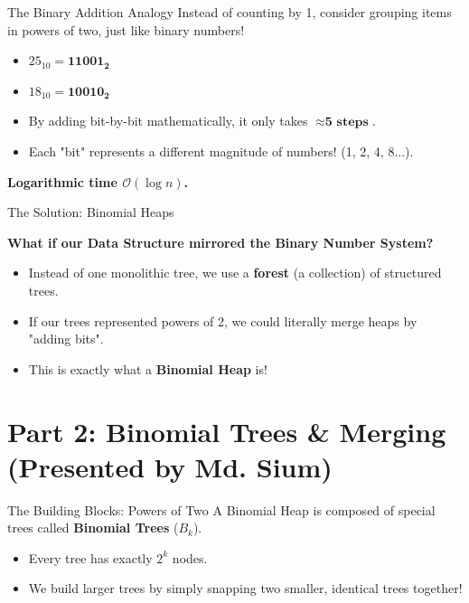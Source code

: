 \documentclass[11pt, aspectratio=169]{beamer}
\begin{document}
\begin{frame}{The Binary Addition Analogy}
    Instead of counting by 1, consider grouping items in powers of two, just like binary numbers!
    \vspace{0.3cm}
    \begin{itemize}
        \item $25_{10} = \mathbf{11001_2}$
        \item $18_{10} = \mathbf{10010_2}$
        \item By adding bit-by-bit mathematically, it only takes $\approx \textbf{5 steps}$.
        \item Each "bit" represents a different magnitude of numbers! (1, 2, 4, 8...).
    \end{itemize}
    \vspace{0.3cm}
    \textbf{Logarithmic time $\mathcal{O}(\log n)$.}
\end{frame}

\begin{frame}{The Solution: Binomial Heaps}
    \begin{center}
        \textbf{What if our Data Structure mirrored the Binary Number System?}
    \end{center}
    \vspace{0.3cm}
    \begin{itemize}
        \item Instead of one monolithic tree, we use a \textbf{forest} (a collection) of structured trees.
        \item If our trees represented powers of 2, we could literally merge heaps by "adding bits".
        \item This is exactly what a \textbf{Binomial Heap} is!
    \end{itemize}
\end{frame}



\section{Part 2: Binomial Trees \& Merging\\ \small{(Presented by Md. Sium)}}

\begin{frame}{The Building Blocks: Powers of Two}
    A Binomial Heap is composed of special trees called \textbf{Binomial Trees} ($B_k$).
    \vspace{0.3cm}
    \begin{itemize}
        \item Every tree has exactly $2^k$ nodes.
        \item We build larger trees by simply snapping two smaller, identical trees together!
    \end{itemize}
\end{frame}
\end{document}
